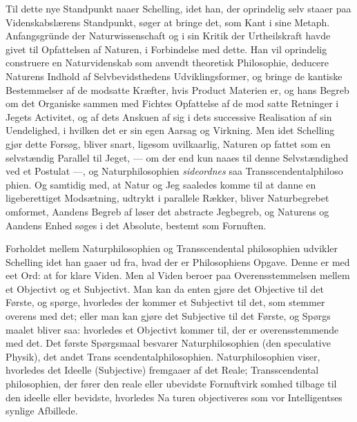 \documentclass[12pt,a4paper]{book}
\begin{document}
Til dette nye Standpunkt naaer Schelling, idet han, der
oprindelig selv staaer paa Videnskabslærens Standpunkt, søger
at bringe det, som Kant i sine Metaph. Anfangsgründe der
Naturwissenschaft og i sin Kritik der Urtheilskraft havde givet
til Opfattelsen af Naturen, i Forbindelse med dette. Han vil
oprindelig construere en Naturvidenskab som anvendt theoretisk
Philosophie, deducere Naturens Indhold af Selvbevidsthedens
Udviklingsformer, og bringe de kantiske Bestemmelser af de
modsatte Kræfter, hvis Product Materien er, og hans Begreb
om det Organiske sammen med Fichtes Opfattelse af de mod\-%
satte Retninger i Jegets Activitet, og af dets Anskuen af sig
i dets successive Realisation af sin Uendelighed, i hvilken det
er sin egen Aarsag og Virkning. Men idet Schelling gjør
dette Forsøg, bliver snart, ligesom uvilkaarlig, Naturen op\-%
fattet som en selvstændig Parallel til Jeget, --- om der end
kun naaes til denne Selvstændighed ved et Postulat ---, og
Naturphilosophien \emph{sideordnes} saa Transscendentalphiloso\-%
phien. Og samtidig med, at Natur og Jeg saaledes komme
til at danne en ligeberettiget Modsætning, udtrykt i parallele
Rækker, bliver Naturbegrebet omformet, Aandens Begreb af\-%
løser det abstracte Jegbegreb, og Naturens og Aandens Enhed
søges i det Absolute, bestemt som Fornuften.

Forholdet mellem Naturphilosophien og Transscendental\-%
philosophien udvikler Schelling idet han gaaer ud fra, hvad
der er Philosophiens Opgave. Denne er med eet Ord: at for\-%
klare Viden. Men al Viden beroer paa Overensstemmelsen
mellem et Objectivt og et Subjectivt. Man kan da enten
gjøre det Objective til det Første, og spørge, hvorledes der
kommer et Subjectivt til det, som stemmer overens med det;
eller man kan gjøre det Subjective til det Første, og Spørgs\-%
maalet bliver saa: hvorledes et Objectivt kommer til, der er
overensstemmende med det. Det første Spørgsmaal besvarer
Naturphilosophien (den speculative Physik), det andet Trans\-%
scendentalphilosophien. Naturphilosophien viser, hvorledes det
Ideelle (Subjective) fremgaaer af det Reale; Transscendental\-%
philosophien, der fører den reale eller ubevidste Fornuftvirk\-%
somhed tilbage til den ideelle eller bevidste, hvorledes Na\-%
turen objectiveres som vor Intelligentses synlige Afbillede.
\end{document}
